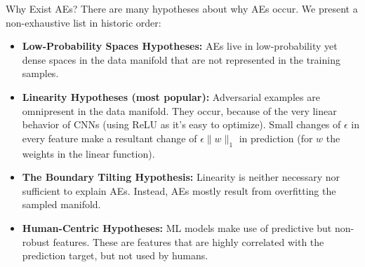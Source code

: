 \documentclass[11pt,compress,t,notes=noshow, xcolor=table]{beamer}
\begin{document}
\begin{vbframe}{Why Exist AEs?}
There are many hypotheses about why AEs occur. We present a non-exhaustive list in historic order:
\begin{itemize}
    \item \textbf{Low-Probability Spaces Hypotheses:} AEs live in low-probability yet dense spaces in the data manifold that are not represented in the training samples.
    \item \textbf{Linearity Hypotheses (most popular):} Adversarial examples are omnipresent in the data manifold. They occur, because of the very linear behavior of CNNs (using ReLU as it's easy to optimize). Small changes of $\epsilon$ in every feature make a resultant change of $\epsilon\|w\|_1$ in prediction (for $w$ the weights in the linear function).
    \item \textbf{The Boundary Tilting Hypothesis:} Linearity is neither necessary nor sufficient to explain AEs. Instead, AEs mostly result from overfitting the sampled manifold.
    \item \textbf{Human-Centric Hypotheses:} ML models make use of predictive but non-robust features. These are features that are highly correlated with the prediction target, but not used by humans.
\end{itemize}
\end{vbframe}
\end{document}
